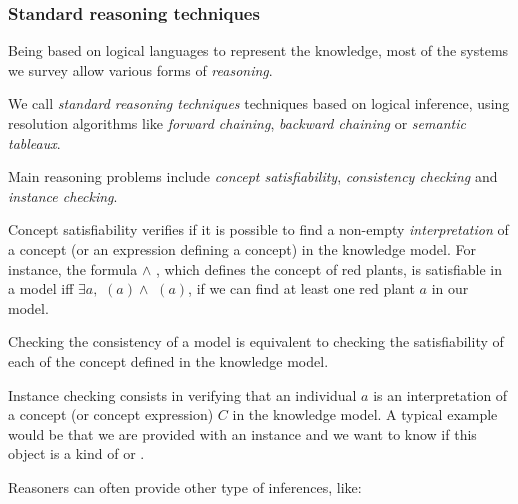 \subsubsection{Standard reasoning techniques}

Being based on logical languages to represent the knowledge, most of the
systems we survey allow various forms of \emph{reasoning}.

We call \emph{standard reasoning techniques} techniques based on logical
inference, using resolution algorithms like \emph{forward chaining},
\emph{backward chaining} or \emph{semantic tableaux}.

Main reasoning problems include \emph{concept satisfiability},
\emph{consistency checking} and \emph{instance checking}.

Concept satisfiability verifies if it is possible to find a non-empty
\emph{interpretation} of a concept (or an expression defining a concept) in the
knowledge model. For instance, the formula  $\land$
, which defines the concept of red plants, is satisfiable in a
model  iff $\exists a, $ $(a) \land$
$(a)$, \ie if we can find at least one red plant $a$ in our
model.

Checking the consistency of a model is equivalent to checking the
satisfiability of each of the concept defined in the knowledge model.

Instance checking consists in verifying that an individual $a$ is an
interpretation of a concept (or concept expression) $C$ in the knowledge model.
A typical example would be that we are provided with an instance
 and we want to know if this object is a kind of
 or .

Reasoners can often provide other type of inferences, like:

